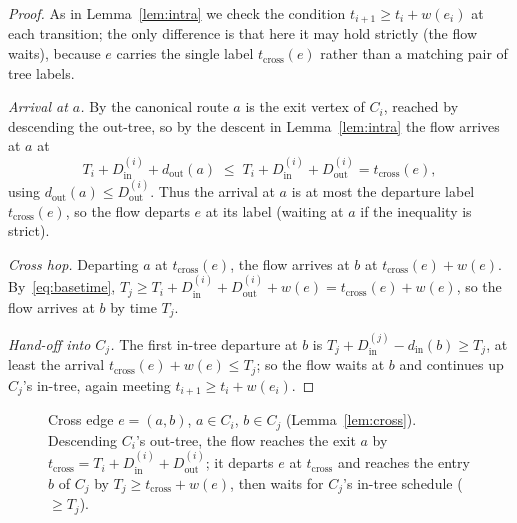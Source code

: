 \documentclass[11pt]{article}
\theoremstyle{definition}
\theoremstyle{remark}
\newcommand{\din}{d_{\mathrm{in}}}
\newcommand{\dout}{d_{\mathrm{out}}}
\newcommand{\Din}{D^{(i)}_{\mathrm{in}}}
\newcommand{\Dout}{D^{(i)}_{\mathrm{out}}}
\begin{document}
\begin{proof}
As in Lemma~\ref{lem:intra} we check the condition $t_{i+1}\ge t_i+w(e_i)$ at each transition; the only
difference is that here it may hold strictly (the flow waits), because $e$ carries the single label
$t_{\mathrm{cross}}(e)$ rather than a matching pair of tree labels.

\emph{Arrival at $a$.} By the canonical route $a$ is the exit vertex of $C_i$, reached by descending the
out-tree, so by the descent in Lemma~\ref{lem:intra} the flow arrives at $a$ at
\[
  T_i+\Din+\dout(a)\;\le\;T_i+\Din+\Dout=t_{\mathrm{cross}}(e),
\]
using $\dout(a)\le\Dout$. Thus the arrival at $a$ is at most the departure label $t_{\mathrm{cross}}(e)$,
so the flow departs $e$ at its label (waiting at $a$ if the inequality is strict).

\emph{Cross hop.} Departing $a$ at $t_{\mathrm{cross}}(e)$, the flow arrives at $b$ at
$t_{\mathrm{cross}}(e)+w(e)$. By~\eqref{eq:basetime}, $T_j\ge T_i+\Din+\Dout+w(e)=t_{\mathrm{cross}}(e)+w(e)$,
so the flow arrives at $b$ by time $T_j$.

\emph{Hand-off into $C_j$.} The first in-tree departure at $b$ is $T_j+D^{(j)}_{\mathrm{in}}-\din(b)\ge T_j$,
at least the arrival $t_{\mathrm{cross}}(e)+w(e)\le T_j$; so the flow waits at $b$ and continues up
$C_j$'s in-tree, again meeting $t_{i+1}\ge t_i+w(e_i)$.
\end{proof}

\begin{figure}[H]
\centering
{}
\caption{Cross edge $e=(a,b)$, $a\in C_i$, $b\in C_j$ (Lemma~\ref{lem:cross}). Descending $C_i$'s
out-tree, the flow reaches the exit $a$ by $t_{\mathrm{cross}}=T_i+\Din+\Dout$; it departs $e$ at
$t_{\mathrm{cross}}$ and reaches the entry $b$ of $C_j$ by $T_j\ge t_{\mathrm{cross}}+w(e)$, then waits
for $C_j$'s in-tree schedule ($\ge T_j$).}
\label{fig:cross}
\end{figure}
\end{document}
